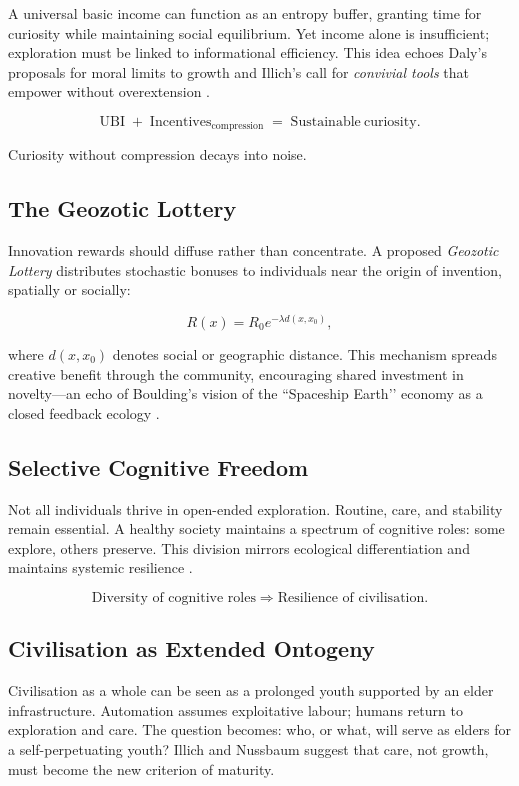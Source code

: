 \documentclass[12pt,a4paper]{article}
\begin{document}
A universal basic income can function as an entropy buffer, 
granting time for curiosity while maintaining social equilibrium.  
Yet income alone is insufficient; exploration must be linked to informational efficiency.
This idea echoes Daly’s proposals for moral limits to growth 
\citep{daly1977steady,daly2020rethinking} 
and Illich’s call for \emph{convivial tools} that empower without overextension 
\citep{illich1973tools}.

\[
\mathrm{UBI}
\;+\;
\mathrm{Incentives}_{\mathrm{compression}}
\;=\;
\mathrm{Sustainable\ curiosity.}
\]

Curiosity without compression decays into noise.

\subsection{The Geozotic Lottery}

Innovation rewards should diffuse rather than concentrate.  
A proposed \textit{Geozotic Lottery} distributes stochastic bonuses 
to individuals near the origin of invention, spatially or socially:

\[
R(x) = R_0 e^{-\lambda d(x,x_0)},
\]

where \(d(x,x_0)\) denotes social or geographic distance.  
This mechanism spreads creative benefit through the community, 
encouraging shared investment in novelty---an echo of Boulding’s vision 
of the ``Spaceship Earth’’ economy as a closed feedback ecology 
\citep{boulding1966spaceship}.

\subsection{Selective Cognitive Freedom}

Not all individuals thrive in open-ended exploration.  
Routine, care, and stability remain essential.  
A healthy society maintains a spectrum of cognitive roles:
some explore, others preserve.  
This division mirrors ecological differentiation 
and maintains systemic resilience \citep{capra2021systems,dalziel2022thermodynamics}.

\[
\text{Diversity of cognitive roles}
\;\Rightarrow\;
\text{Resilience of civilisation.}
\]

\subsection{Civilisation as Extended Ontogeny}

Civilisation as a whole can be seen as a prolonged youth supported by an elder infrastructure.
Automation assumes exploitative labour; humans return to exploration and care.
The question becomes: who, or what, will serve as elders for a self-perpetuating youth?
Illich \citep{illich1973tools} and Nussbaum \citep{nussbaum2019capabilities}
suggest that care, not growth, must become the new criterion of maturity.
\end{document}

